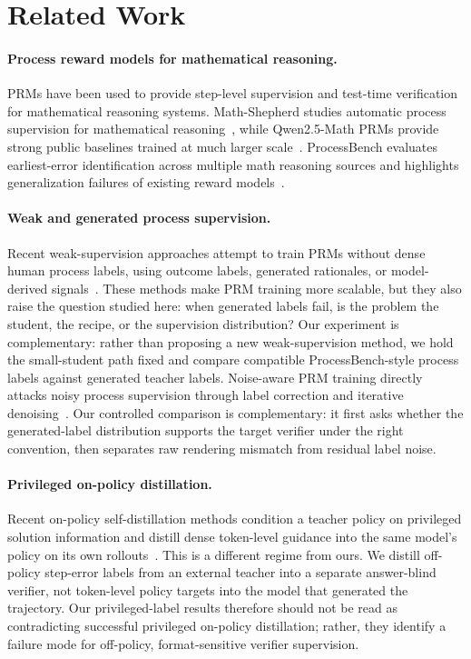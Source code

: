 \documentclass{article}
\begin{document}
\section{Related Work}

\paragraph{Process reward models for mathematical reasoning.}
PRMs have been used to provide step-level supervision and test-time verification for mathematical reasoning systems.
Math-Shepherd studies automatic process supervision for mathematical reasoning~\cite{mathshepherd}, while Qwen2.5-Math PRMs provide strong public baselines trained at much larger scale~\cite{qwenprm}.
ProcessBench evaluates earliest-error identification across multiple math reasoning sources and highlights generalization failures of existing reward models~\cite{processbench}.

\paragraph{Weak and generated process supervision.}
Recent weak-supervision approaches attempt to train PRMs without dense human process labels, using outcome labels, generated rationales, or model-derived signals~\cite{freeprm}.
These methods make PRM training more scalable, but they also raise the question studied here: when generated labels fail, is the problem the student, the recipe, or the supervision distribution?
Our experiment is complementary: rather than proposing a new weak-supervision method, we hold the small-student path fixed and compare compatible ProcessBench-style process labels against generated teacher labels.
Noise-aware PRM training directly attacks noisy process supervision through label correction and iterative denoising~\cite{noiseawareprm}.
Our controlled comparison is complementary: it first asks whether the generated-label distribution supports the target verifier under the right convention, then separates raw rendering mismatch from residual label noise.

\paragraph{Privileged on-policy distillation.}
Recent on-policy self-distillation methods condition a teacher policy on privileged solution information and distill dense token-level guidance into the same model's policy on its own rollouts~\cite{opsd,pwopsd}.
This is a different regime from ours.
We distill off-policy step-error labels from an external teacher into a separate answer-blind verifier, not token-level policy targets into the model that generated the trajectory.
Our privileged-label results therefore should not be read as contradicting successful privileged on-policy distillation; rather, they identify a failure mode for off-policy, format-sensitive verifier supervision.
\end{document}
